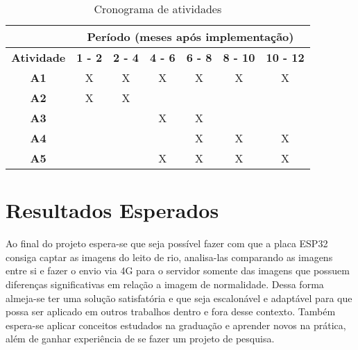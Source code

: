 \documentclass[12pt]{article}
\begin{document}
\begin{spacing}{1}
\begin{itemize}
\end{itemize}

\begin{table}[!htb]
\centering
\begin{tabular}{|c|c|c|c|c|c|c|}
\hline
\multicolumn{1}{|c|}{} & \multicolumn{6}{c|}{\textbf{Período (meses após implementação)}} \\ \hline
\textbf{Atividade} & \textbf{1 - 2} & \textbf{2 - 4} & \textbf{4 - 6} & \textbf{6 - 8} & \textbf{8 - 10} & \textbf{10 - 12} \\ \hline
\textbf{A1} & X & X & X & X & X & X \\ \hline
\textbf{A2} & X & X &   &   &   &   \\ \hline
\textbf{A3} &   &   & X & X &   &   \\ \hline
\textbf{A4} &   &   &   & X & X & X \\ \hline
\textbf{A5} &   &   & X & X & X & X \\ \hline
\end{tabular}
\caption{Cronograma de atividades}
\label{tab1}
\end{table}

\FloatBarrier

\section{Resultados Esperados}
Ao final do projeto espera-se que seja possível fazer com que a placa ESP32 consiga captar as imagens do leito de rio, analisa-las comparando as imagens entre si e fazer o envio via 4G para o servidor somente das imagens que possuem diferenças significativas em relação a imagem de normalidade. Dessa forma almeja-se ter uma solução satisfatória e que seja escalonável e adaptável para que possa ser aplicado em outros trabalhos dentro e fora desse contexto. Também espera-se aplicar conceitos estudados na graduação e aprender novos na prática, além de ganhar experiência de se fazer um projeto de pesquisa.


\end{spacing}
 
 
\newpage


% 




\end{document}
